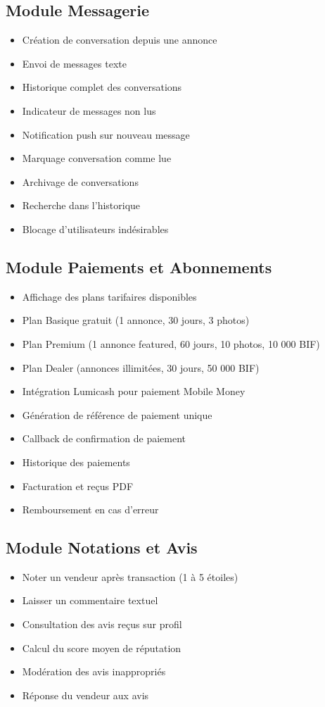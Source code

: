 \documentclass[12pt,a4paper]{report}
\begin{document}
\subsection{Module Messagerie}
\begin{itemize}
    \item Création de conversation depuis une annonce
    \item Envoi de messages texte
    \item Historique complet des conversations
    \item Indicateur de messages non lus
    \item Notification push sur nouveau message
    \item Marquage conversation comme lue
    \item Archivage de conversations
    \item Recherche dans l'historique
    \item Blocage d'utilisateurs indésirables
\end{itemize}

\subsection{Module Paiements et Abonnements}
\begin{itemize}
    \item Affichage des plans tarifaires disponibles
    \item Plan Basique gratuit (1 annonce, 30 jours, 3 photos)
    \item Plan Premium (1 annonce featured, 60 jours, 10 photos, 10 000 BIF)
    \item Plan Dealer (annonces illimitées, 30 jours, 50 000 BIF)
    \item Intégration Lumicash pour paiement Mobile Money
    \item Génération de référence de paiement unique
    \item Callback de confirmation de paiement
    \item Historique des paiements
    \item Facturation et reçus PDF
    \item Remboursement en cas d'erreur
\end{itemize}

\subsection{Module Notations et Avis}
\begin{itemize}
    \item Noter un vendeur après transaction (1 à 5 étoiles)
    \item Laisser un commentaire textuel
    \item Consultation des avis reçus sur profil
    \item Calcul du score moyen de réputation
    \item Modération des avis inappropriés
    \item Réponse du vendeur aux avis
\end{itemize}
\end{document}
